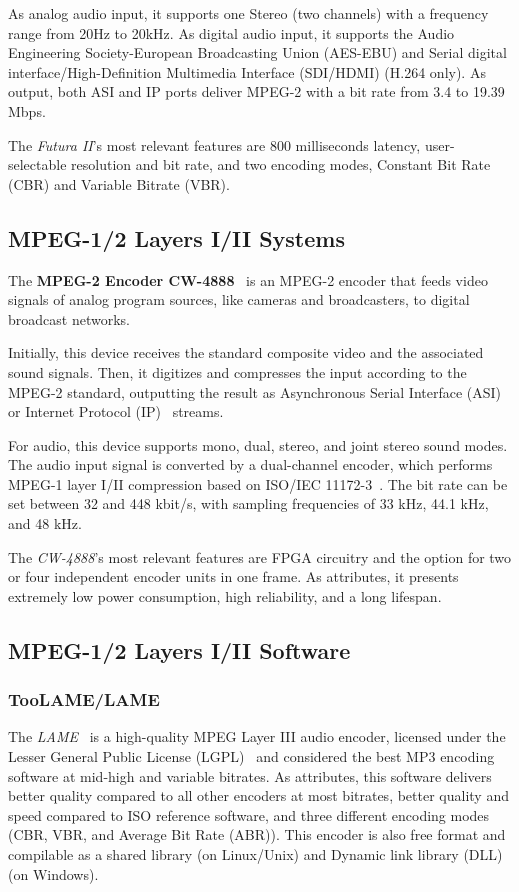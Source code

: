 As analog audio input, it supports one Stereo (two channels) with a frequency range from 20Hz to 20kHz. As digital audio input, it supports the Audio Engineering Society-European Broadcasting Union (AES-EBU) and Serial digital interface/High-Definition Multimedia Interface (SDI/HDMI) (H.264 only).
As output, both ASI and IP ports deliver MPEG-2 with a bit rate from 3.4 to 19.39 Mbps.

The \textit{Futura II}'s most relevant features are 800 milliseconds latency, user-selectable resolution and bit rate, and two encoding modes, Constant Bit Rate (CBR) and Variable Bitrate (VBR).

\subsection{MPEG-1/2 Layers I/II Systems}

The \textbf{MPEG-2 Encoder CW-4888}~\cite{cw4888} is an MPEG-2 encoder that feeds video signals of analog program sources, like cameras and broadcasters, to digital broadcast networks.

Initially, this device receives the standard composite video and the associated sound signals. Then, it digitizes and compresses the input according to the MPEG-2 standard, outputting the result as Asynchronous Serial Interface (ASI)~\cite{asi} or Internet Protocol (IP)~\cite{ip} streams.

For audio, this device supports mono, dual, stereo, and joint stereo sound modes. The audio input signal is converted by a dual-channel encoder, which performs MPEG-1 layer I/II compression based on ISO/IEC 11172-3~\cite{11172}. 
The bit rate can be set between 32 and 448 kbit/s, with sampling frequencies of 33 kHz, 44.1 kHz, and 48 kHz.

The \textit{CW-4888}'s most relevant features are FPGA circuitry and the option for two or four independent encoder units in one frame.
As attributes, it presents extremely low power consumption, high reliability, and a long lifespan.

\subsection{MPEG-1/2 Layers I/II Software}

\subsubsection{TooLAME/LAME}

The \textit{LAME}~\cite{bib:lame} is a high-quality MPEG Layer III audio encoder, licensed under the Lesser General Public License (LGPL)~\cite{lgpl} and considered the best MP3 encoding software at mid-high and variable bitrates. 
As attributes, this software delivers better quality compared to all other encoders at most bitrates, better quality and speed compared to ISO reference software, and three different encoding modes (CBR, VBR, and Average Bit Rate (ABR)). This encoder is also free format and compilable as a shared library (on Linux/Unix) and Dynamic link library (DLL)~\cite{dll} (on Windows).

